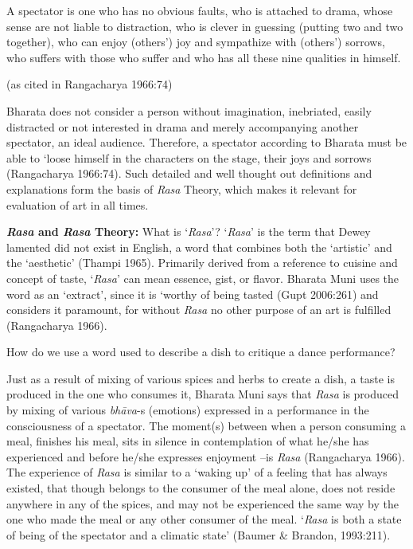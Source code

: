 \begin{myquote}
A spectator is one who has no obvious faults, who is attached to drama, whose sense are not liable to distraction, who is clever in guessing (putting two and two together), who can enjoy (others’) joy and sympathize with (others’) sorrows, who suffers with those who suffer and who has all these nine qualities in himself. 

\hfill (as cited in Rangacharya 1966:74)
\end{myquote}

Bharata does not consider a person without imagination, inebriated, easily distracted or not interested in drama and merely accompanying another spectator, an ideal audience. Therefore, a spectator according to Bharata must be able to ‘loose himself in the characters on the stage, their joys and sorrows (Rangacharya 1966:74). Such detailed and well thought out definitions and explanations form the basis of \textsl{Rasa} Theory, which makes it relevant for evaluation of art in all times. 

\textbf{\textsl{Rasa} and \textsl{Rasa} Theory:} What is ‘\textsl{Rasa}'? ‘\textsl{Rasa}’ is the term that Dewey lamented did not exist in English, a word that combines both the ‘artistic’ and the ‘aesthetic’ (Thampi 1965). Primarily derived from a reference to cuisine and concept of taste, ‘\textsl{Rasa}' can mean essence, gist, or flavor. Bharata Muni uses the word as an ‘extract’, since it is ‘worthy of being tasted (Gupt 2006:261) and considers it paramount, for without \textsl{Rasa} no other purpose of an art is fulfilled (Rangacharya 1966).  

How do we use a word used to describe a dish to critique a dance performance? 

Just as a result of mixing of various spices and herbs to create a dish, a taste is produced in the one who consumes it, Bharata Muni says that \textsl{Rasa} is produced by mixing of various \textsl{bhāva}-s (emotions) expressed in a performance in the consciousness of a spectator. The moment(s) between when a person consuming a meal, finishes his meal, sits in silence in contemplation of what he/she has experienced and before he/she expresses enjoyment --is \textsl{Rasa} (Rangacharya 1966). The experience of \textsl{Rasa} is similar to a ‘waking up’ of a feeling that has always existed, that though belongs to the consumer of the meal alone, does not reside anywhere in any of the spices, and may not be experienced the same way by the one who made the meal or any other consumer of the meal. ‘\textsl{Rasa} is both a state of being of the spectator and a climatic state’ (Baumer \& Brandon, 1993:211).


